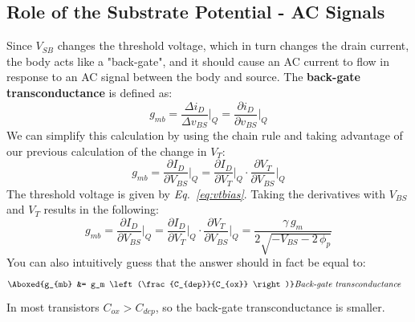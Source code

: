 \subsection{Role of the Substrate Potential - AC Signals}
Since $V_{SB}$ changes the threshold voltage, which in turn changes the drain current, the body acts like a "back-gate", and it should cause an AC current to flow in response to an AC signal between the body and source.  The \textbf{back-gate transconductance} is defined as:
    \begin{equation} 
        g_{mb} = \frac{\Delta i_D}{\Delta v_{BS}} \bigg\rvert_Q
        = \frac{\partial i_D}{\partial v_{BS}} \bigg\rvert_Q
    \end{equation}
We can simplify this calculation by using the chain rule and taking advantage of our previous calculation of the change in $V_T$:
    \begin{equation}
        g_{mb} = \frac{\partial I_D}{\partial V_{BS}} \bigg\rvert_Q
        = \frac{\partial I_D}{\partial V_{T}} \bigg\rvert_Q \cdot \frac{\partial V_{T}}{\partial V_{BS}} \bigg\rvert_Q
    \end{equation}
The threshold voltage is given by \emph{Eq.~\ref{eq:vtbias}}.  Taking the derivatives with $V_{BS}$ and $V_T$ results in the following:
    \begin{equation}
        g_{mb} = \frac{\partial I_D}{\partial V_{BS}} \bigg\rvert_Q
        = \frac{\partial I_D}{\partial V_{T}} \bigg\rvert_Q \cdot \frac{\partial V_{T}}{\partial V_{BS}} \bigg\rvert_Q
        = \frac{\gamma\,g_m}{2\sqrt{-V_{BS} - 2\,\phi_p}}
    \end{equation}
You can also intuitively guess that the answer should in fact be equal to:
    \begin{align}
        \Aboxed{g_{mb} &= g_m \left(\frac{C_{dep}}{C_{ox}} \right)} &\textit{Back-gate transconductance}
    \end{align}
In most transistors $C_{ox} > C_{dep}$, so the back-gate transconductance is smaller.
\newpage
